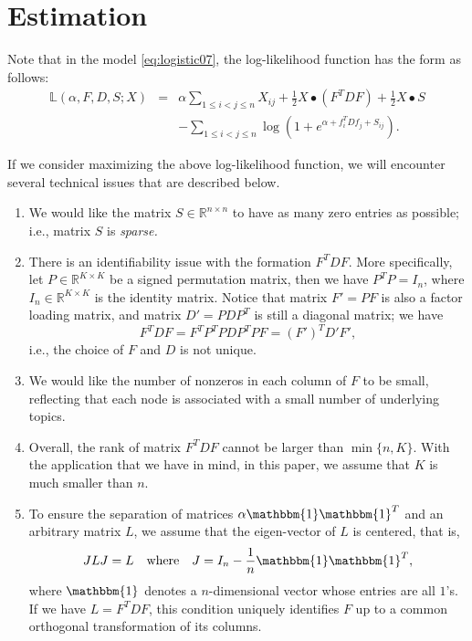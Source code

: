 \documentclass[AMS,STIX1COL]{WileyNJD-v2}
\begin{document}
{\section{Estimation}
\label{sec:estimate}
Note that in the model \eqref{eq:logistic07}, the log-likelihood function has the form as follows:
\begin{eqnarray}
\label{eq:logistic08}
\mathbb{L}(\alpha,  F, D, S; X)
&=& \alpha \sum_{1\le i< j\le n}X_{ij} +\frac{1}{2} X \bullet (F^T D F) +\frac{1}{2} X \bullet S \\
&& -\sum_{1\le i<j\le n} \log \left(1 + e^{\alpha + f_i^T D f_j +S_{ij} }\right). \nonumber
\end{eqnarray}

If we consider maximizing the above log-likelihood function,
we will encounter several technical issues that are described below.
\begin{enumerate}
\item We would like the matrix $S \in \mathbb{R}^{n \times n}$ to have as many zero entries as possible; i.e., matrix $S$ is {\it sparse.}

\item There is an identifiability issue with the formation $F^T D F$.
More specifically, let $P \in \mathbb{R}^{K \times K}$ be a signed permutation matrix, then we have $P^T P = I_n$, where $I_n \in \mathbb{R}^{K \times K}$ is the identity matrix.
Notice that matrix $F' = PF$ is also a factor loading matrix, and
matrix $D' = P D P^T$ is still a diagonal matrix;
we have
$$
F^T D F = F^T P^T P D P^T P F = (F')^T D' F',
$$
i.e., the choice of $F$ and $D$ is not unique.

\item We would like the number of nonzeros in each column of $F$ to be small, reflecting that each node is associated with a small number of underlying topics.

\item Overall, the rank of matrix $F^T D F$ cannot be larger than $\min\{n,K\}$.
With the application that we have in mind, in this paper, we assume that $K$ is much smaller than $n$.

\item To ensure the separation of matrices $\alpha\mathbbm{1}\mathbbm{1}^T$ and an arbitrary matrix $L$, we assume that the eigen-vector of $L$ is centered, that is,
\[
    JLJ = L \quad \mbox{where} \quad
    J=I_{n}-\frac{1}{n}\mathbbm{1}\mathbbm{1}^T,
\]
where $\mathbbm{1}$ denotes a $n$-dimensional vector whose entries are all $1$'s. If we have $L=F^TDF$, this condition uniquely identifies $F$ up to a common orthogonal transformation of its columns.


\end{enumerate}}
\end{document}
